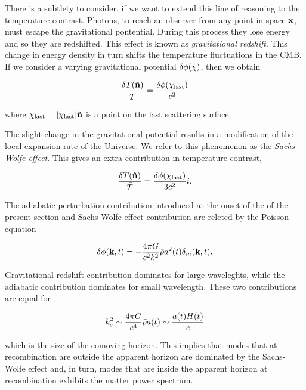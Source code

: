 There is a subtlety to consider, if we want to extend this line of reasoning
to the temperature contrast. Photons, to reach an observer from any point
in space $\vb{x}$, must escape the gravitational pontential. During this
process they lose energy and so they are redshifted. This effect is known
as \emph{gravitational redshift}. This change in energy density in turn
shifts the temperature fluctuations in the CMB. If we consider a varying
gravitational potential $\delta \phi\qty(\vb{\chi})$, then we obtain

\begin{equation}
        \frac{\var{T\qty(\vu{n})}}{\bar T} =
        \frac{\var{\phi\qty(\vb{\chi}_\text{last})}}{c^2}
\end{equation}

where $\vb{\chi}_\text{last} = \abs{\vb{\chi}_\text{last}} \vu{n}$ is a
point on the last scattering surface.

The slight change in the gravitational potential results in a modification
of the local expansion rate of the Universe. We refer to this phenomenon as
the \emph{Sachs-Wolfe effect}. This gives an extra contribution in
temperature contrast,

\begin{equation}
        \frac{\var{T\qty(\vu{n})}}{\bar T} =
        \frac{\var{\phi\qty(\vb{\chi}_\text{last})}}{3c^2}i.
\end{equation}

The adiabatic perturbation contribution introduced at the onset of the of
the present section and Sachs-Wolfe effect contribution are releted by the
Poisson equation

\begin{equation}
        \var{\phi\qty(\vb{k},t)} = -\frac{4\pi G}{c^2 k^2}
        \bar \rho a^2\qty(t) \delta_m\qty(\vb{k},t).
\end{equation}

Gravitational redshift contribution dominates for large waveleghts, while
the adiabatic contribution dominates for small wavelength. These two
contributions are equal for

\begin{equation}
        k^2_c \sim \frac{4\pi G}{c^4}\bar \rho a\qty(t) \sim
        \frac{a\qty(t)H\qty(t)}{c} 
\end{equation}

which is the size of the comoving horizon. This implies that modes that at
recombination are outside the apparent horizon are dominated by the
Sachs-Wolfe effect and, in turn, modes that are inside the apparent horizon
at recombination exhibits the matter power spectrum.


